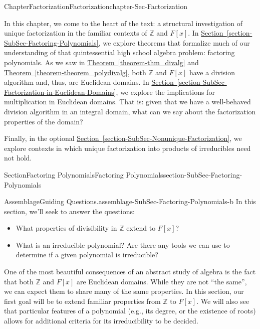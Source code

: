 \documentclass[oneside,10pt,]{book}
\newcommand{\xreffont}{\relax}
\numberwithin{equation}{section}
\def\Z{{\mathbb Z}}
\begin{document}
\begin{chapterptx}{Chapter}{Factorization}{}{Factorization}{}{}{chapter-Sec-Factorization}
\renewcommand*{\chaptername}{Chapter}
\begin{introduction}{}%
In this chapter, we come to the heart of the text: a structural investigation of unique factorization in the familiar contexts of \(\Z\) and \(F[x]\). In \hyperref[section-SubSec-Factoring-Polynomials]{Section~{\xreffont\ref{section-SubSec-Factoring-Polynomials}}}, we explore theorems that formalize much of our understanding of that quintessential high school algebra problem: factoring polynomials. As we saw in \hyperref[theorem-thm_divalg]{Theorem~{\xreffont\ref{theorem-thm_divalg}}} and \hyperref[theorem-theorem_polydivalg]{Theorem~{\xreffont\ref{theorem-theorem_polydivalg}}}, both \(\Z\) and \(F[x]\) have a division algorithm and, thus, are Euclidean domains. In \hyperref[section-SubSec-Factorization-in-Euclidean-Domains]{Section~{\xreffont\ref{section-SubSec-Factorization-in-Euclidean-Domains}}}, we explore the implications for multiplication in Euclidean domains. That is: given that we have a well-behaved division algorithm in an integral domain, what can we say about the factorization properties of the domain?%
\par
Finally, in the optional \hyperref[section-SubSec-Nonunique-Factorization]{Section~{\xreffont\ref{section-SubSec-Nonunique-Factorization}}}, we explore contexts in which unique factorization into products of irreducibles need not hold.%
\end{introduction}%
%
%
\typeout{************************************************}
\typeout{************************************************}
%
\begin{sectionptx}{Section}{Factoring Polynomials}{}{Factoring Polynomials}{}{}{section-SubSec-Factoring-Polynomials}
\begin{assemblage}{Assemblage}{Guiding Questions.}{assemblage-SubSec-Factoring-Polynomials-b}%
In this section, we'll seek to answer the questions: %
\begin{itemize}[label=\textbullet]
\item{}What properties of divisibility in \(\Z\) extend to \(F[x]\)?%
\item{}What is an irreducible polynomial? Are there any tools we can use to determine if a given polynomial is irreducible?%
\end{itemize}
%
\end{assemblage}
One of the most beautiful consequences of an abstract study of algebra is the fact that both \(\Z\) and \(F[x]\) are Euclidean domains. While they are not ``the same'', we can expect them to share many of the same properties. In this section, our first goal will be to extend familiar properties from \(\Z\) to \(F[x]\). We will also see that particular features of a polynomial (e.g., its degree, or the existence of roots) allows for additional criteria for its irreducibility to be decided.%

\end{sectionptx}
\end{chapterptx}
\end{document}
